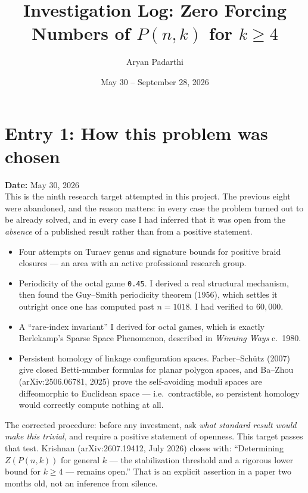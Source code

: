 \documentclass[12pt]{article}
\title{Investigation Log: Zero Forcing Numbers of $P(n,k)$ for $k\ge4$}
\author{Aryan Padarthi}
\date{May 30 -- September 28, 2026}
\begin{document}
\maketitle

\section*{Entry 1: How this problem was chosen}
\textbf{Date:} May 30, 2026\\
This is the ninth research target attempted in this project. The previous eight
were abandoned, and the reason matters: in every case the problem turned out to
be already solved, and in every case I had inferred that it was open from the
\emph{absence} of a published result rather than from a positive statement.

\begin{itemize}[leftmargin=*]
\item Four attempts on Turaev genus and signature bounds for positive braid
closures --- an area with an active professional research group.
\item Periodicity of the octal game \texttt{0.45}. I derived a real structural
mechanism, then found the Guy--Smith periodicity theorem (1956), which settles
it outright once one has computed past $n=1018$. I had verified to $60{,}000$.
\item A ``rare-index invariant'' I derived for octal games, which is exactly
Berlekamp's Sparse Space Phenomenon, described in \emph{Winning Ways} c.\ 1980.
\item Persistent homology of linkage configuration spaces. Farber--Sch\"utz
(2007) give closed Betti-number formulas for planar polygon spaces, and
Ba--Zhou (arXiv:2506.06781, 2025) prove the self-avoiding moduli spaces are
diffeomorphic to Euclidean space --- i.e.\ contractible, so persistent homology
would correctly compute nothing at all.
\end{itemize}

The corrected procedure: before any investment, ask \emph{what standard result
would make this trivial}, and require a positive statement of openness. This
target passes that test. Krishnan (arXiv:2607.19412, July 2026) closes with:
``Determining $Z(P(n,k))$ for general $k$ --- the stabilization threshold and a
rigorous lower bound for $k\ge4$ --- remains open.'' That is an explicit
assertion in a paper two months old, not an inference from silence.
\end{document}
